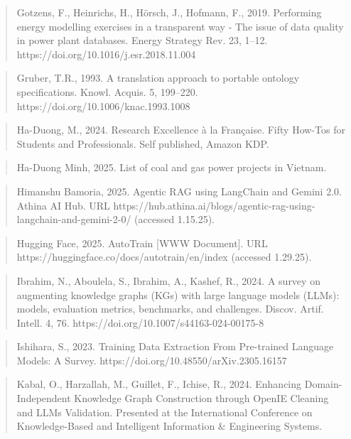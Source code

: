 \documentclass[a4paper,11pt]{report}
\begin{document}
\begin{quote}
Gotzens, F., Heinrichs, H., Hörsch, J., Hofmann, F., 2019. Performing energy modelling exercises in a transparent way - The issue of data quality in power plant databases. Energy Strategy Rev. 23, 1--12. https://doi.org/10.1016/j.esr.2018.11.004
\end{quote}

\begin{quote}
Gruber, T.R., 1993. A translation approach to portable ontology specifications. Knowl. Acquis. 5, 199--220. https://doi.org/10.1006/knac.1993.1008
\end{quote}

\begin{quote}
Ha-Duong, M., 2024. Research Excellence à la Française. Fifty How-Tos for Students and Professionals. Self published, Amazon KDP.
\end{quote}

\begin{quote}
Ha-Duong Minh, 2025. List of coal and gas power projects in Vietnam.
\end{quote}

\begin{quote}
Himanshu Bamoria, 2025. Agentic RAG using LangChain and Gemini 2.0. Athina AI Hub. URL https://hub.athina.ai/blogs/agentic-rag-using-langchain-and-gemini-2-0/ (accessed 1.15.25).
\end{quote}

\begin{quote}
Hugging Face, 2025. AutoTrain {[}WWW Document{]}. URL https://huggingface.co/docs/autotrain/en/index (accessed 1.29.25).
\end{quote}

\begin{quote}
Ibrahim, N., Aboulela, S., Ibrahim, A., Kashef, R., 2024. A survey on augmenting knowledge graphs (KGs) with large language models (LLMs): models, evaluation metrics, benchmarks, and challenges. Discov. Artif. Intell. 4, 76. https://doi.org/10.1007/s44163-024-00175-8
\end{quote}

\begin{quote}
Ishihara, S., 2023. Training Data Extraction From Pre-trained Language Models: A Survey. https://doi.org/10.48550/arXiv.2305.16157
\end{quote}

\begin{quote}
Kabal, O., Harzallah, M., Guillet, F., Ichise, R., 2024. Enhancing Domain-Independent Knowledge Graph Construction through OpenIE Cleaning and LLMs Validation. Presented at the International Conference on Knowledge-Based and Intelligent Information \& Engineering Systems.
\end{quote}
\end{document}
